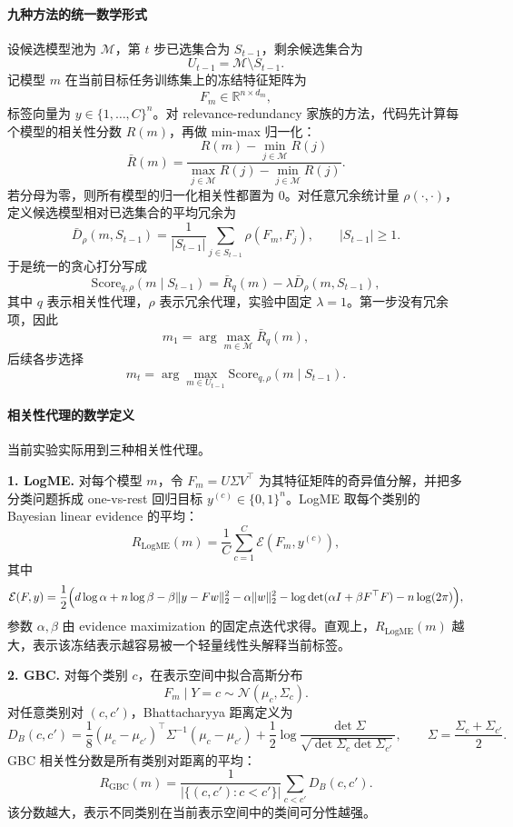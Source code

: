 \documentclass[UTF8,fontset=fandol]{ctexart}
\theoremstyle{remark}
\begin{document}
\paragraph{九种方法的统一数学形式}
设候选模型池为 $\mathcal M$，第 $t$ 步已选集合为 $S_{t-1}$，剩余候选集合为
\[
U_{t-1} = \mathcal M \setminus S_{t-1}.
\]
记模型 $m$ 在当前目标任务训练集上的冻结特征矩阵为
\[
F_m \in \mathbb R^{n \times d_m},
\]
标签向量为 $y \in \{1,\dots,C\}^n$。对 relevance-redundancy 家族的方法，代码先计算每个模型的相关性分数 $R(m)$，再做 min-max 归一化：
\[
\bar R(m)
= \frac{R(m) - \min_{j \in \mathcal M} R(j)}
       {\max_{j \in \mathcal M} R(j) - \min_{j \in \mathcal M} R(j)}.
\]
若分母为零，则所有模型的归一化相关性都置为 $0$。对任意冗余统计量 $\rho(\cdot,\cdot)$，定义候选模型相对已选集合的平均冗余为
\[
\bar D_\rho(m, S_{t-1})
= \frac{1}{|S_{t-1}|}\sum_{j \in S_{t-1}} \rho(F_m, F_j),
\qquad |S_{t-1}| \ge 1.
\]
于是统一的贪心打分写成
\[
\mathrm{Score}_{q,\rho}(m \mid S_{t-1})
= \bar R_q(m) - \lambda \bar D_\rho(m, S_{t-1}),
\]
其中 $q$ 表示相关性代理，$\rho$ 表示冗余代理，实验中固定 $\lambda = 1$。第一步没有冗余项，因此
\[
m_1 = \arg\max_{m \in \mathcal M} \bar R_q(m),
\]
后续各步选择
\[
m_t = \arg\max_{m \in U_{t-1}} \mathrm{Score}_{q,\rho}(m \mid S_{t-1}).
\]

\paragraph{相关性代理的数学定义}
当前实验实际用到三种相关性代理。

\textbf{1. LogME.}
对每个模型 $m$，令 $F_m = U \Sigma V^\top$ 为其特征矩阵的奇异值分解，并把多分类问题拆成 one-vs-rest 回归目标 $y^{(c)} \in \{0,1\}^n$。LogME 取每个类别的 Bayesian linear evidence 的平均：
\[
R_{\mathrm{LogME}}(m)
= \frac{1}{C}\sum_{c=1}^C \mathcal E(F_m, y^{(c)}),
\]
其中
\[
\mathcal E(F, y)
= \frac{1}{2}\Bigl(
d \log \alpha + n \log \beta
- \beta \|y - Fw\|_2^2
- \alpha \|w\|_2^2
- \log\det(\alpha I + \beta F^\top F)
- n\log(2\pi)
\Bigr),
\]
参数 $\alpha,\beta$ 由 evidence maximization 的固定点迭代求得。直观上，$R_{\mathrm{LogME}}(m)$ 越大，表示该冻结表示越容易被一个轻量线性头解释当前标签。

\textbf{2. GBC.}
对每个类别 $c$，在表示空间中拟合高斯分布
\[
F_m \mid Y=c \sim \mathcal N(\mu_c, \Sigma_c).
\]
对任意类别对 $(c,c')$，Bhattacharyya 距离定义为
\[
D_B(c,c')
= \frac{1}{8}(\mu_c-\mu_{c'})^\top \Sigma^{-1}(\mu_c-\mu_{c'})
+ \frac{1}{2}\log
\frac{\det \Sigma}{\sqrt{\det \Sigma_c \det \Sigma_{c'}}},
\qquad
\Sigma = \frac{\Sigma_c + \Sigma_{c'}}{2}.
\]
GBC 相关性分数是所有类别对距离的平均：
\[
R_{\mathrm{GBC}}(m)
= \frac{1}{|\{(c,c') : c<c'\}|}
\sum_{c<c'} D_B(c,c').
\]
该分数越大，表示不同类别在当前表示空间中的类间可分性越强。
\end{document}
